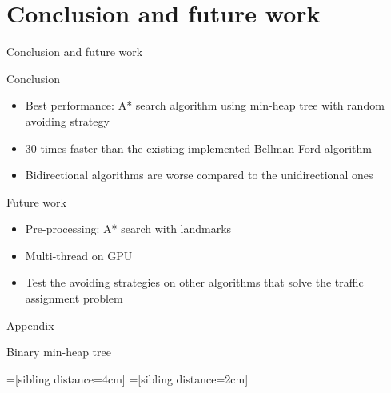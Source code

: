 \documentclass{beamer}
\begin{document}
\section{Conclusion and future work}
\begin{frame}{Conclusion and future work}
    \begin{block}{Conclusion}
        \begin{itemize}
            \itemsep.5em
            \item Best performance: A* search algorithm using min-heap tree with random avoiding strategy
            \item 30 times faster than the existing implemented Bellman-Ford algorithm
            \item Bidirectional algorithms are worse compared to the unidirectional ones
        \end{itemize}
    \end{block}

    \begin{block}{Future work}
        \begin{itemize}
            \itemsep.5em
            \item Pre-processing: A* search with landmarks
            \item Multi-thread on GPU
            \item Test the avoiding strategies on other algorithms that solve the traffic assignment problem
        \end{itemize}
    \end{block}
\end{frame}

\appendix
\begin{frame}[c]
    \begin{center}
        \Huge
        Appendix
    \end{center}
\end{frame}

\begin{frame}{Binary min-heap tree}
    \begin{center}
        =[sibling distance=4cm]
        =[sibling distance=2cm]
    \end{center}
\end{frame}
\end{document}
